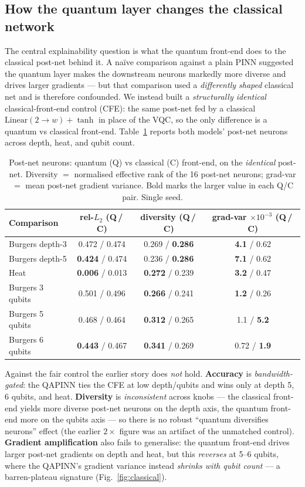 \documentclass[11pt]{article}
\begin{document}
\subsection{How the quantum layer changes the classical network}
The central explainability question is what the quantum front-end does to the
classical post-net behind it. A na\"ive comparison against a plain PINN suggested
the quantum layer makes the downstream neurons markedly more diverse and drives
larger gradients --- but that comparison used a \emph{differently shaped} classical
net and is therefore confounded. We instead built a \emph{structurally identical}
classical-front-end control (CFE): the same post-net fed by a classical
$\mathrm{Linear}(2\!\to\!w)+\tanh$ in place of the VQC, so the only difference is a
quantum vs classical front-end. Table~\ref{tab:classical} reports both models'
post-net neurons across depth, heat, and qubit count.

\begin{table}[t]
  \centering \small
  \begin{tabular}{lccc}
    \toprule
    Comparison & rel-$L_2$ (Q\,/\,C) & diversity (Q\,/\,C) & grad-var $\times10^{-3}$ (Q\,/\,C) \\
    \midrule
    Burgers depth-3 & 0.472 / 0.474 & 0.269 / \textbf{0.286} & \textbf{4.1} / 0.62 \\
    Burgers depth-5 & \textbf{0.424} / 0.474 & 0.236 / \textbf{0.286} & \textbf{7.1} / 0.62 \\
    Heat            & \textbf{0.006} / 0.013 & \textbf{0.272} / 0.239 & \textbf{3.2} / 0.47 \\
    Burgers 3 qubits & 0.501 / 0.496 & \textbf{0.266} / 0.241 & \textbf{1.2} / 0.26 \\
    Burgers 5 qubits & 0.468 / 0.464 & \textbf{0.312} / 0.265 & 1.1 / \textbf{5.2} \\
    Burgers 6 qubits & \textbf{0.443} / 0.467 & \textbf{0.341} / 0.269 & 0.72 / \textbf{1.9} \\
    \bottomrule
  \end{tabular}
  \caption{Post-net neurons: quantum (Q) vs classical (C) front-end, on the
  \emph{identical} post-net. Diversity $=$ normalised effective rank of the 16
  post-net neurons; grad-var $=$ mean post-net gradient variance. Bold marks the
  larger value in each Q/C pair. Single seed.}
  \label{tab:classical}
\end{table}

Against the fair control the earlier story does \emph{not} hold.
\textbf{Accuracy} is \emph{bandwidth-gated}: the QAPINN ties the CFE at low
depth/qubits and wins only at depth 5, 6 qubits, and heat. \textbf{Diversity} is
\emph{inconsistent} across knobs --- the classical front-end yields more diverse
post-net neurons on the depth axis, the quantum front-end more on the qubits axis
--- so there is no robust ``quantum diversifies neurons'' effect (the earlier
$2\times$ figure was an artifact of the unmatched control). \textbf{Gradient
amplification} also fails to generalise: the quantum front-end drives larger
post-net gradients on depth and heat, but this \emph{reverses} at 5--6 qubits,
where the QAPINN's gradient variance instead \emph{shrinks with qubit count} --- a
barren-plateau signature (Fig.~\ref{fig:classical}).
\end{document}
